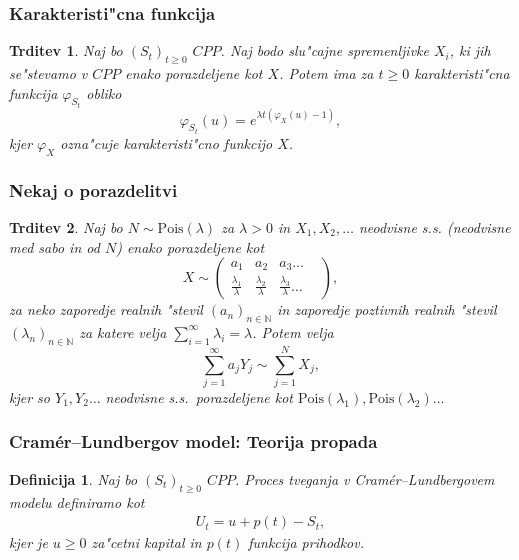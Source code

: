 \documentclass[]{beamer} %
\theoremstyle{plain}
\newtheorem{definicija}{Definicija}
\newtheorem{trditev}{Trditev}
\newcommand{\N}{\mathbb{N}}
\newcommand{\1}{\mathds{1}}
\newcommand{\Pois}[1]{\text{Pois}(#1)}
\begin{document}
\begin{frame}
  \frametitle{Karakteristi"cna funkcija}
  \begin{trditev}
    Naj bo $(S_t)_{t\geq0}$ $CPP$. Naj bodo slu"cajne spremenljivke $X_i$, ki jih se"stevamo v 
    $CPP$ enako porazdeljene kot $X$. Potem ima za $t\geq0$ karakteristi"cna funkcija $\varphi_{S_t}$ 
    obliko
    \begin{equation*}
        \varphi_{S_t}(u) = e^{\lambda t\left(\varphi_X(u) - 1\right)}, 
    \end{equation*}
    kjer $\varphi_X$ ozna"cuje karakteristi"cno funkcijo $X$.
    \label{trd:MomentGener}
    \end{trditev}
\end{frame}

\begin{frame}
    \frametitle{Nekaj o porazdelitvi}
    \begin{trditev}
        Naj bo $N\sim \Pois{\lambda}$  za $\lambda >0$ in $X_1, X_2, \dots $ neodvisne s.s. (neodvisne 
        med sabo in od $N$) enako porazdeljene kot
        $$ X\sim
        \begin{pmatrix}
            a_1 & a_2 & a_3  \dots & \\
            \tfrac{\lambda_1}{\lambda} & \tfrac{\lambda_2}{\lambda} & \tfrac{\lambda_3}{\lambda} \dots & 
        \end{pmatrix},
        $$
        za neko zaporedje realnih "stevil $(a_n)_{n\in\N}$ in 
        zaporedje poztivnih realnih "stevil $(\lambda_n)_{n\in\N}$ za katere velja 
        ${\sum_{i=1}^\infty\lambda_i = \lambda}$.
        Potem velja 
        \begin{equation*}
            \sum_{j=1}^\infty a_jY_j \sim \sum_{j=1}^NX_j,
        \end{equation*}
        kjer so $Y_1, Y_2 \dots$ neodvisne s.s.\ porazdeljene kot 
        $\Pois{\lambda_1}, \Pois{\lambda_2} \dots $
        \label{trd:NXjeEnakoaY}
    \end{trditev}
\end{frame}

\begin{frame}
    \frametitle{Cramér--Lundbergov model: Teorija propada}
    \begin{definicija}
        Naj bo $(S_t)_{t\geq0}$ $CPP$.
        \textit{Proces tveganja} v Cramér--Lundbergovem modelu definiramo kot
        \begin{align*}
            U_t = u + p(t) - S_t,
        \end{align*}
        kjer je $u \geq 0$ za"cetni kapital in $p(t)$ funkcija prihodkov. 
        \label{def:procesTveganja}
    \end{definicija}
\end{frame}
\end{document}
